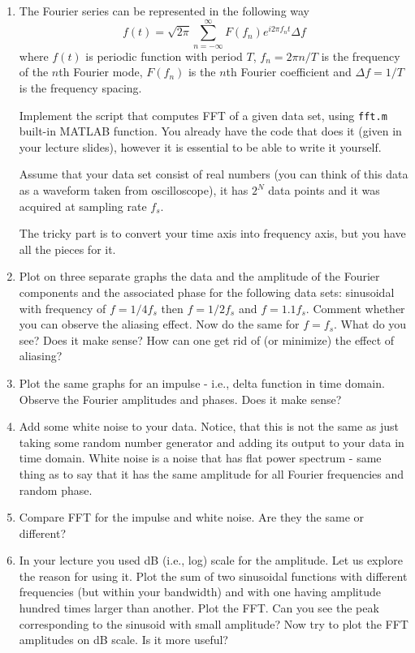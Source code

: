 \documentclass[letterpaper]{article}
\begin{document}
\begin{enumerate}
\item
The Fourier series can be represented in the following way
\begin{equation*}
f(t)=\sqrt{2 \pi}\sum_{n=-\infty}^{\infty} F(f_n)e^{i 2\pi f_n t} \Delta f
\end{equation*}
where $f(t)$ is periodic function with period $T$, $f_n=2\pi n/T$ is the frequency of the $n$th Fourier mode, $F(f_n)$ is the $n$th Fourier coefficient and $\Delta f=1/T$ is the frequency spacing. 

Implement the script that computes FFT of a given data set, using \verb|fft.m| built-in MATLAB function. You already have the code that does it (given in your lecture slides), however it is essential to be able to write it yourself.

Assume that your data set consist of real numbers (you can think of this data as a waveform taken from oscilloscope), it has $2^N$ data points and it was acquired at sampling rate $f_s$. 

The tricky part is to convert your time axis into frequency axis, but you have all the pieces for it. 
\item Plot on three separate graphs the data and the amplitude of the Fourier components and the associated phase for the following data sets: sinusoidal with frequency of $f=1/4 f_s$ then  $f=1/2 f_s$ and $f=1.1 f_s$. Comment whether you can observe the aliasing effect. Now do the same for $f=f_s$. What do you see? Does it make sense? How can one get rid of (or minimize) the effect of aliasing? 
\item Plot the same graphs for an impulse - i.e., delta function in time domain. Observe the Fourier amplitudes and phases. Does it make sense?
\item Add some white noise to your data. Notice, that this is not the same as just taking some random number generator and adding its output to your data in time domain. White noise is a noise that has flat power spectrum - same thing as to say that it has the same amplitude for all Fourier frequencies and random phase. 
\item Compare FFT for the impulse and white noise. Are they the same or different? 
\item In your lecture you used dB (i.e., log) scale for the amplitude. Let us explore the reason for using it. Plot the sum of two sinusoidal functions with different frequencies (but within your bandwidth) and with one having amplitude hundred times larger than another. Plot the FFT. Can you see the peak corresponding to the sinusoid with small amplitude? Now try to plot the FFT amplitudes on dB scale. Is it more useful?
\end{enumerate}
\end{document}
